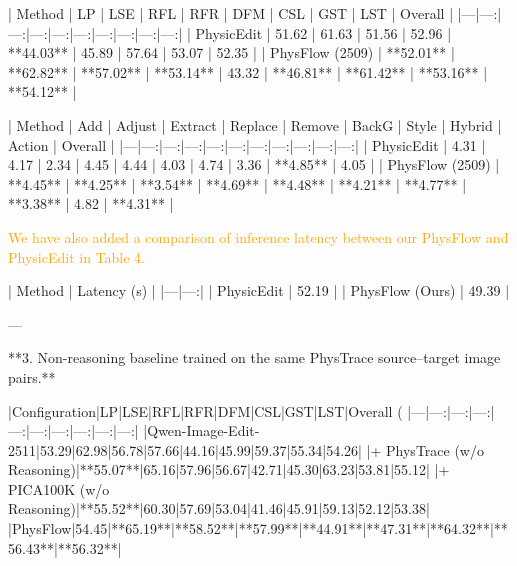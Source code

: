 \documentclass{article}
\begin{document}
| Method | LP | LSE | RFL | RFR | DFM | CSL | GST | LST | Overall |
|---|---:|---:|---:|---:|---:|---:|---:|---:|---:|
| PhysicEdit | 51.62 | 61.63 | 51.56 | 52.96 | **44.03** | 45.89 | 57.64 | 53.07 | 52.35 |
| PhysFlow (2509) | **52.01** | **62.82** | **57.02** | **53.14** | 43.32 | **46.81** | **61.42** | **53.16** | **54.12** |

| Method | Add | Adjust | Extract | Replace | Remove | BackG | Style | Hybrid | Action | Overall |
|---|---:|---:|---:|---:|---:|---:|---:|---:|---:|---:|
| PhysicEdit | 4.31 | 4.17 | 2.34 | 4.45 | 4.44 | 4.03 | 4.74 | 3.36 | **4.85** | 4.05 |
| PhysFlow (2509) | **4.45** | **4.25** | **3.54** | **4.69** | **4.48** | **4.21** | **4.77** | **3.38** | 4.82 | **4.31** |

\textcolor{orange}{
We have also added a comparison of inference latency between our PhysFlow and PhysicEdit in Table 4.
}

| Method | Latency (s) |
|---|---:|
| PhysicEdit | 52.19 |
| PhysFlow (Ours) | 49.39 |

---

**3. Non-reasoning baseline trained on the same PhysTrace source–target image pairs.**

{\color{orange}{
Following your suggestion, we train a non-reasoning image editor on PhysTrace without reasoning annotations, using the same generator backbone (Qwen-Image-Edit-2511) and a comparable optimization budget to our PhysFlow.
We refer to this baseline as Qwen-Image-Edit-2511 + PhysTrace (w/o Reasoning) and report its results in Table 8.

As shown, the new baseline outperforms the original backbone by 0,86\%.
Under the same source-target image pair training setting, our curated PhysTrace achieves higher overall performance than PICA100K (i.e., Qwen-Image-Edit-2511 + PICA100K (w/o Reasoning)), highlighting its superior data quality and contribution to training efficiency.
Furthermore, our latent reasoning framework further improves the overall score from 55.13\% to 56.32\% over this non-reasoning baseline, demonstrating the effectiveness of our proposed approach.
}}

|Configuration|LP|LSE|RFL|RFR|DFM|CSL|GST|LST|Overall (%
|---|---:|---:|---:|---:|---:|---:|---:|---:|---:|
|Qwen-Image-Edit-2511|53.29|62.98|56.78|57.66|44.16|45.99|59.37|55.34|54.26|
|+ PhysTrace (w/o Reasoning)|**55.07**|65.16|57.96|56.67|42.71|45.30|63.23|53.81|55.12|
|+ PICA100K (w/o Reasoning)|**55.52**|60.30|57.69|53.04|41.46|45.91|59.13|52.12|53.38|
|PhysFlow|54.45|**65.19**|**58.52**|**57.99**|**44.91**|**47.31**|**64.32**|**56.43**|**56.32**|
\end{document}
